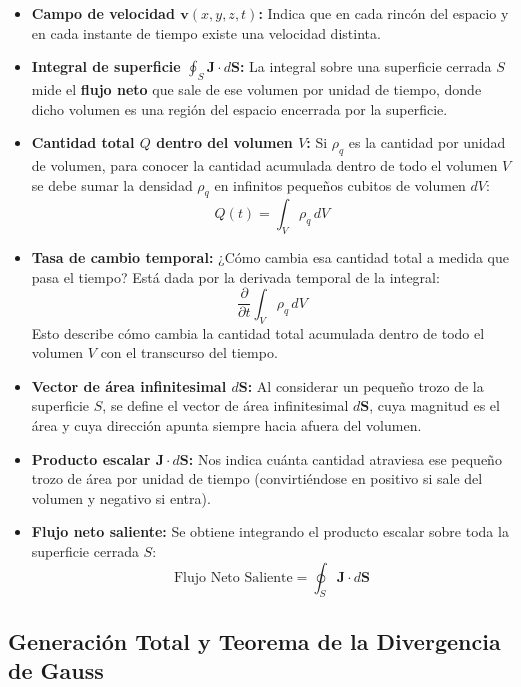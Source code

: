 \documentclass[11pt,letterpaper]{article}
\begin{document}
\begin{itemize}
    \item \textbf{Campo de velocidad $\mathbf{v}(x,y,z,t)$:} Indica que en cada rincón del espacio y en cada instante de tiempo existe una velocidad distinta.
    \item \textbf{Integral de superficie $\oint_S \mathbf{J} \cdot d\mathbf{S}$:} La integral sobre una superficie cerrada $S$ mide el \textbf{flujo neto} que sale de ese volumen por unidad de tiempo, donde dicho volumen es una región del espacio encerrada por la superficie.
    \item \textbf{Cantidad total $Q$ dentro del volumen $V$:} Si $\rho_q$ es la cantidad por unidad de volumen, para conocer la cantidad acumulada dentro de todo el volumen $V$ se debe sumar la densidad $\rho_q$ en infinitos pequeños cubitos de volumen $dV$:
    \begin{equation}
        Q(t) = \int_V \rho_q \, dV
    \end{equation}
    \item \textbf{Tasa de cambio temporal:} ¿Cómo cambia esa cantidad total a medida que pasa el tiempo? Está dada por la derivada temporal de la integral:
    \begin{equation}
        \frac{\partial}{\partial t} \int_V \rho_q \, dV
    \end{equation}
    Esto describe cómo cambia la cantidad total acumulada dentro de todo el volumen $V$ con el transcurso del tiempo.
    \item \textbf{Vector de área infinitesimal $d\mathbf{S}$:} Al considerar un pequeño trozo de la superficie $S$, se define el vector de área infinitesimal $d\mathbf{S}$, cuya magnitud es el área y cuya dirección apunta siempre hacia afuera del volumen.
    \item \textbf{Producto escalar $\mathbf{J} \cdot d\mathbf{S}$:} Nos indica cuánta cantidad atraviesa ese pequeño trozo de área por unidad de tiempo (convirtiéndose en positivo si sale del volumen y negativo si entra).
    \item \textbf{Flujo neto saliente:} Se obtiene integrando el producto escalar sobre toda la superficie cerrada $S$:
    \begin{equation}
        \text{Flujo Neto Saliente} = \oint_S \mathbf{J} \cdot d\mathbf{S}
    \end{equation}
\end{itemize}

\subsection{Generación Total y Teorema de la Divergencia de Gauss}
\end{document}
